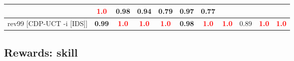 \documentclass{article}
\begin{document}
\begin{tabular}{|l|r@{$\pm$}rr@{$\pm$}rr@{$\pm$}rr@{$\pm$}rr@{$\pm$}rr@{$\pm$}rr@{$\pm$}rr@{$\pm$}rr@{$\pm$}rr@{$\pm$}r|}
& \multicolumn{2}{c}{\textbf{\textcolor{red}{1.0}}}
& \multicolumn{2}{c}{0.98}
& \multicolumn{2}{c}{0.94}
& \multicolumn{2}{c}{0.79}
& \multicolumn{2}{c}{0.97}
& \multicolumn{2}{c|}{0.77}
\\
\hline
rev99 [CDP-UCT -i [IDS]]
& \multicolumn{2}{c}{\textbf{0.99}}
& \multicolumn{2}{c}{\textbf{\textcolor{red}{1.0}}}
& \multicolumn{2}{c}{\textbf{\textcolor{red}{1.0}}}
& \multicolumn{2}{c}{\textbf{\textcolor{red}{1.0}}}
& \multicolumn{2}{c}{\textbf{0.98}}
& \multicolumn{2}{c}{\textbf{\textcolor{red}{1.0}}}
& \multicolumn{2}{c}{\textbf{\textcolor{red}{1.0}}}
& \multicolumn{2}{c}{0.89}
& \multicolumn{2}{c}{\textbf{\textcolor{red}{1.0}}}
& \multicolumn{2}{c|}{\textbf{\textcolor{red}{1.0}}}
\\
\hline
\end{tabular}%

\bigskip

\subsection*{Rewards: skill}
\end{document}
